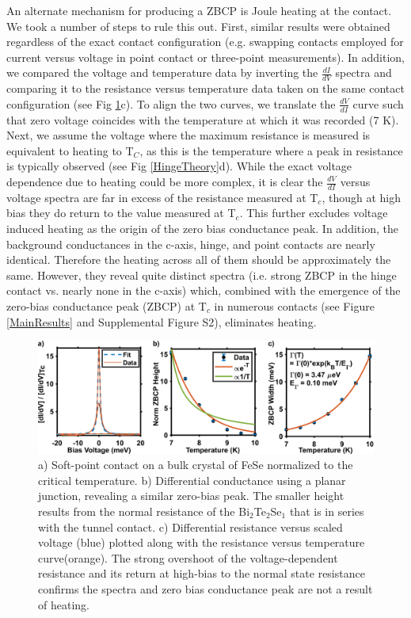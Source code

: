 An alternate mechanism for producing a ZBCP is Joule heating at the contact. We took a number of steps to rule this out. First, similar results were obtained regardless of the exact contact configuration (e.g. swapping contacts employed for current versus voltage in point contact or three-point measurements). In addition, we compared the voltage and temperature data by inverting the $\frac{dI}{dV}$ spectra and comparing it to the resistance versus temperature data taken on the same contact configuration (see Fig \ref{Controls}c). To align the two curves, we translate the $\frac{dV}{dI}$ curve such that zero voltage coincides with the temperature at which it was recorded (7 K). Next, we assume the voltage where the maximum resistance is measured is equivalent to heating to T$_{C}$, as this is the temperature where a peak in resistance is typically observed (see Fig \ref{HingeTheory}d). While the exact voltage dependence due to heating could be more complex, it is clear the $\frac{dV}{dI}$ versus voltage spectra are far in excess of the resistance measured at T$_{c}$, though at high bias they do return to the value measured at T$_{c}$. This further excludes voltage induced heating as the origin of the zero bias conductance peak. In addition, the background conductances in the c-axis, hinge, and point contacts are nearly identical. Therefore the heating across all of them should be approximately the same. However, they reveal quite distinct spectra (i.e. strong ZBCP in the hinge contact vs. nearly none in the c-axis) which, combined with the emergence of the zero-bias conductance peak (ZBCP) at T$_{c}$ in numerous contacts (see Figure \ref{MainResults} and Supplemental Figure S2), eliminates heating.
\par
\begin{figure}[H]
    \centering
    \includegraphics[width=\textwidth]{Chap3/Figures/Figure4.png}
    \caption{a) Soft-point contact on a bulk crystal of FeSe normalized to the critical temperature. b) Differential conductance using a planar junction, revealing a similar zero-bias peak. The smaller height results from the normal resistance of the Bi$_{2}$Te$_{2}$Se$_{1}$ that is in series with the tunnel contact. c) Differential resistance versus scaled voltage (blue) plotted along with the resistance versus temperature curve(orange). The strong overshoot of the voltage-dependent resistance and its return at high-bias to the normal state resistance confirms the spectra and zero bias conductance peak are not a result of heating.}
    \label{Controls}
\end{figure}
